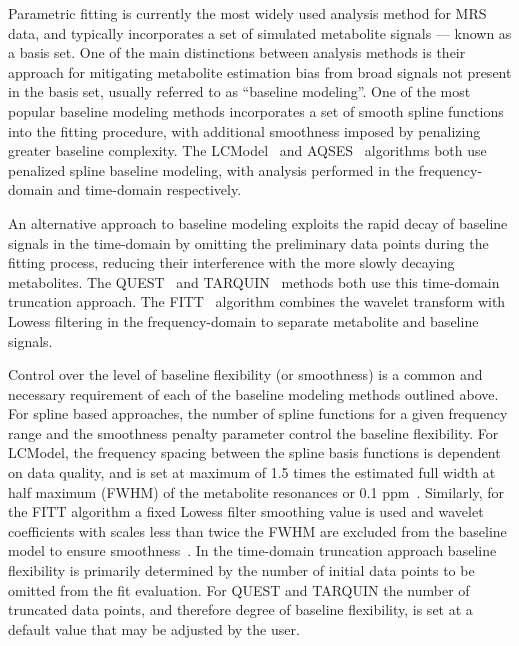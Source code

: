 \documentclass[num-refs]{wiley-article}
\begin{document}
Parametric fitting is currently the most widely used analysis method for MRS data, and typically incorporates a set of simulated metabolite signals --- known as a basis set. One of the main distinctions between analysis methods is their approach for mitigating metabolite estimation bias from broad signals not present in the basis set, usually referred to as ``baseline modeling''. One of the most popular baseline modeling methods incorporates a set of smooth spline functions into the fitting procedure, with additional smoothness imposed by penalizing greater baseline complexity. The LCModel~\cite{Provencher1993} and AQSES~\cite{Poullet2007} algorithms both use penalized spline baseline modeling, with analysis performed in the frequency-domain and time-domain respectively.

An alternative approach to baseline modeling exploits the rapid decay of baseline signals in the time-domain by omitting the preliminary data points during the fitting process, reducing their interference with the more slowly decaying metabolites. The QUEST~\cite{Ratiney2005} and TARQUIN~\cite{Wilson2011} methods both use this time-domain truncation approach. The FITT~\cite{Young1998} algorithm combines the wavelet transform with Lowess filtering in the frequency-domain to separate metabolite and baseline signals.

Control over the level of baseline flexibility (or smoothness) is a common and necessary requirement of each of the baseline modeling methods outlined above. For spline based approaches, the number of spline functions for a given frequency range and the smoothness penalty parameter control the baseline flexibility. For LCModel, the frequency spacing between the spline basis functions is dependent on data quality, and is set at maximum of 1.5 times the estimated full width at half maximum (FWHM) of the metabolite resonances or 0.1 ppm~\cite{Provencher1993}. Similarly, for the FITT algorithm a fixed Lowess filter smoothing value is used and wavelet coefficients with scales less than twice the FWHM are excluded from the baseline model to ensure smoothness~\cite{Young1998}. In the time-domain truncation approach baseline flexibility is primarily determined by the number of initial data points to be omitted from the fit evaluation. For QUEST and TARQUIN the number of truncated data points, and therefore degree of baseline flexibility, is set at a default value that may be adjusted by the user.
\end{document}
